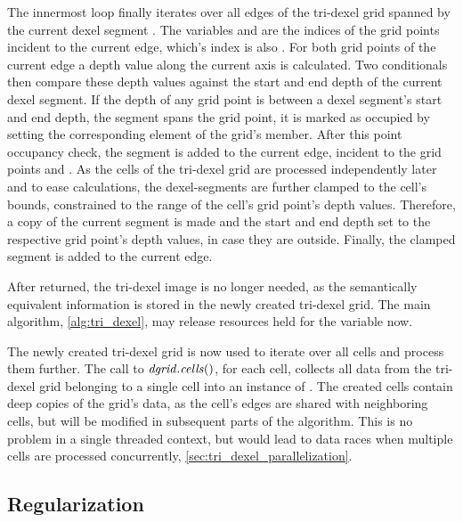 The innermost loop finally iterates over all edges of the tri-dexel grid spanned by the current dexel segment .
The variables  and  are the indices of the grid points incident to the current edge, which's index is also .
For both grid points of the current edge a depth value along the current axis is calculated.
Two conditionals then compare these depth values against the start and end depth of the current dexel segment.
If the depth of any grid point is between a dexel segment's start and end depth, \ie the segment spans the grid point, it is marked as occupied by setting the corresponding element of the grid's  member.
After this point occupancy check, the segment is added to the current edge, incident to the grid points  and .
As the cells of the tri-dexel grid are processed independently later and to ease calculations, the dexel-segments are further clamped to the cell's bounds, \ie constrained to the range of the cell's grid point's depth values.
Therefore, a copy of the current segment is made and the start and end depth set to the respective grid point's depth values, in case they are outside.
Finally, the clamped segment is added to the current edge.

After  returned, the tri-dexel image is no longer needed, as the semantically equivalent information is stored in the newly created tri-dexel grid.
The main algorithm, \cref{alg:tri_dexel}, may release resources held for the  variable now.

The newly created tri-dexel grid  is now used to iterate over all cells and process them further.
The call to $\mathit{dgrid}.\mathit{cells}()$, for each cell, collects all data from the tri-dexel grid belonging to a single cell into an instance of .
The created cells contain deep copies of the grid's data, as the cell's edges are shared with neighboring cells, but will be modified in subsequent parts of the algorithm.
This is no problem in a single threaded context, but would lead to data races when multiple cells are processed concurrently, \cf \cref{sec:tri_dexel_parallelization}.


\subsection{Regularization}
\label{sec:tri_dexel_regularization}

